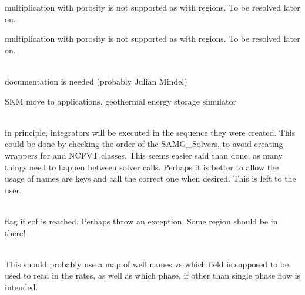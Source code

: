 \begin{DoxyRefList}
\label{todo__todo000208}%
%
multiplication with porosity is not supported as with regions. To be resolved later on. 

\label{todo__todo000209}%
%
multiplication with porosity is not supported as with regions. To be resolved later on.  
\item[Class \doxylink{classcsmp_1_1_simulator_setup}{csmp\+::Simulator\+Setup\texorpdfstring{$<$}{<} dim \texorpdfstring{$>$}{>}} ]\hfill \\
\label{todo__todo000215}%
%
documentation is needed (probably Julian Mindel)

\label{todo__todo000216}%
%
SKM move to applications, geothermal energy storage simulator 
\item[Member \doxylink{classcsmp_1_1_simulator_setup_aeabddb09a6d075feebef30e2ce87d125}{csmp\+::Simulator\+Setup\texorpdfstring{$<$}{<} dim \texorpdfstring{$>$}{>}\+::Add\+\_\+\+DESCompatible\+\_\+\+Integrator} (std\+::string name)]\hfill \\
\label{todo__todo000217}%
%
in principle, integrators will be executed in the sequence they were created. This could be done by checking the order of the SAMG\+\_\+\+Solvers, to avoid creating wrappers for  and NCFVT classes. This seems easier said than done, as many things need to happen between solver calls. Perhaps it is better to allow the usage of names are keys and call the correct one when desired. This is left to the user.  
\item[Member \doxylink{classcsmp_1_1_simulator_setup_abb85d25c075998016512114f2d436c5b}{csmp\+::Simulator\+Setup\texorpdfstring{$<$}{<} dim \texorpdfstring{$>$}{>}\+::Read\+Options\+From\+Regions\+File} ()]\hfill \\
\label{todo__todo000210}%
%
flag if eof is reached. Perhaps throw an exception. Some region should be in there!  
\item[Member \doxylink{classcsmp_1_1_simulator_setup_a80c329bc8e39cdadfde173215265df09}{csmp\+::Simulator\+Setup\texorpdfstring{$<$}{<} dim \texorpdfstring{$>$}{>}\+::Setup\+Well\+Rates\+Based\+On\+Rate\+Variables} ()]\hfill \\
\label{todo__todo000211}%
%
This should probably use a map of well names vs which field is supposed to be used to read in the rates, as well as which phase, if other than single phase flow is intended. 


\end{DoxyRefList}
